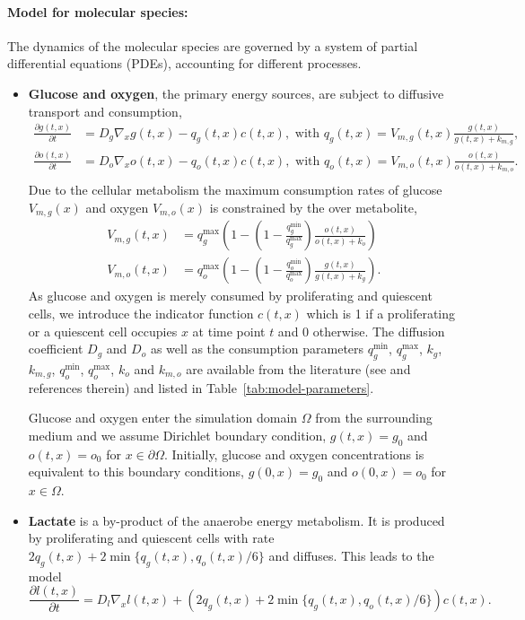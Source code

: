 \documentclass[10pt,letterpaper]{article}
\begin{document}
\paragraph{Model for molecular species:} 
The dynamics of the molecular species are governed by a system of partial differential equations (PDEs), accounting for different processes.
\begin{itemize}
%
\item \textbf{Glucose and oxygen}, the primary energy sources, are subject to diffusive transport and consumption,
\begin{equation*}
\begin{aligned}
	\frac{\partial g(t,x)}{\partial t} &= D_g \nabla_x g(t,x) - q_g(t,x) c(t,x), \text{ with } q_g(t,x) = V_{m,g}(t,x) \frac{g(t,x)}{g(t,x)+k_{m,g}},\\
	\frac{\partial o(t,x)}{\partial t} &= D_o \nabla_x o(t,x) - q_o(t,x) c(t,x), \text{ with } q_o(t,x) = V_{m,o}(t,x) \frac{o(t,x)}{o(t,x)+k_{m,o}}.\\
\end{aligned}
\end{equation*}
Due to the cellular metabolism the maximum consumption rates of glucose $V_{m,g}(x)$ and oxygen $V_{m,o}(x)$ is constrained by the over metabolite,
\begin{equation*}
\begin{aligned}
V_{m,g}(t,x) &= q_g^{\max} \left(1 - \left(1- \frac{q_g^{\min}}{q_g^{\max}} \right) \frac{o(t,x)}{o(t,x) + k_o} \right) \\
V_{m,o}(t,x) &= q_o^{\max} \left(1 - \left(1- \frac{q_o^{\min}}{q_o^{\max}} \right) \frac{g(t,x)}{g(t,x) + k_g} \right).
\end{aligned}
\end{equation*}
As glucose and oxygen is merely consumed by proliferating and quiescent cells, we introduce the indicator function $c(t,x)$ which is 1 if a proliferating or a quiescent cell occupies $x$ at time point $t$ and 0 otherwise. The diffusion coefficient $D_g$ and $D_o$ as well as the consumption parameters $q_g^{\min}$, $q_g^{\max}$, $k_g$, $k_{m,g}$, $q_o^{\min}$, $q_o^{\max}$, $k_o$ and $k_{m,o}$ are available from the literature (see \cite{Jagiella2012} and references therein) and listed in Table~\ref{tab:model-parameters}.

Glucose and oxygen enter the simulation domain $\Omega$ from the surrounding medium and we assume Dirichlet boundary condition, $g(t,x) = g_0$ and $o(t,x) = o_0$ for $x \in \partial\Omega$. Initially, glucose and oxygen concentrations is equivalent to this boundary conditions, $g(0,x) = g_0$ and $o(0,x) = o_0$ for $x \in \Omega$. 
%
\item \textbf{Lactate} is a by-product of the anaerobe energy metabolism. It is produced by proliferating and quiescent cells with rate $2 q_g(t,x) + 2 \min\{q_g(t,x), q_o(t,x)/6\}$ and diffuses. This leads to the model
\begin{equation*}
	\frac{\partial l(t,x)}{\partial t} = D_l \nabla_x l(t,x) + \left(2 q_g(t,x) + 2 \min\{q_g(t,x), q_o(t,x)/6\}\right) c(t,x).
\end{equation*}


\end{itemize}
\end{document}
